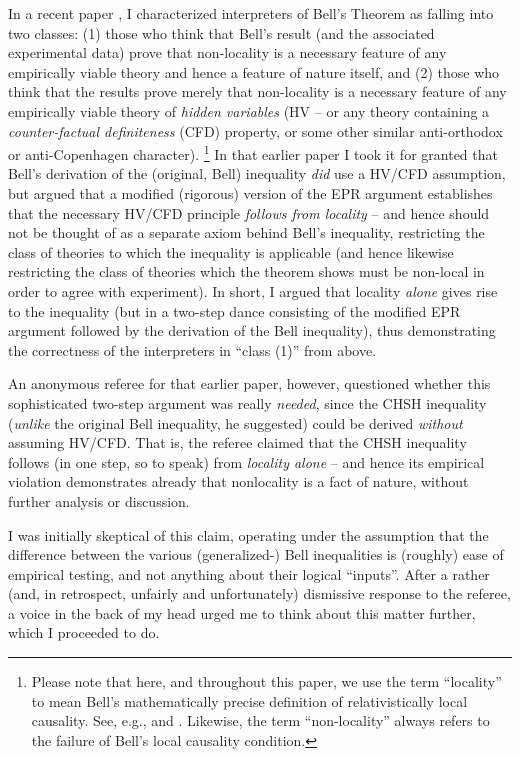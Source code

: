 \documentclass[aps,prc,twocolumn]{revtex4}
\begin{document}
In a recent paper \cite{nonlocchar}, 
I characterized interpreters of Bell's Theorem 
\cite{bell} as falling into two classes:  (1) those who think that
Bell's result (and the associated experimental data) prove that
non-locality is a necessary feature of any empirically viable theory
and hence a feature of nature itself, and (2) those who think that the
results prove merely that non-locality is a necessary feature of any
empirically viable theory of \emph{hidden variables} (HV -- or any theory
containing a \emph{counter-factual definiteness} (CFD) property, or some
other similar anti-orthodox or anti-Copenhagen character).  
\footnote{Please note that here, and throughout this paper, we use the
  term ``locality'' to mean Bell's
  mathematically precise definition of relativistically local
  causality.  See, e.g., \cite[pg 232-248, pg 52-62]{bell} and
  \cite{nonlocchar}.  Likewise, the term ``non-locality'' always
  refers to the failure of Bell's local causality condition.}
In that earlier paper I took it for granted that Bell's derivation of
the (original, Bell) inequality \emph{did} use a HV/CFD assumption,
but argued that a modified (rigorous) version of the EPR argument \cite{epr}
establishes that the necessary HV/CFD principle \emph{follows from
  locality} -- and hence should not be thought of as a separate axiom
behind Bell's inequality, restricting the class of theories to which
the inequality is applicable (and hence likewise restricting the class
of theories which the theorem shows must be non-local in order to agree with
experiment).  In short, I argued that locality \emph{alone} gives rise
to the inequality (but in a two-step dance consisting of the modified
EPR argument followed by the derivation of the Bell inequality), thus
demonstrating the correctness of the interpreters in ``class (1)''
from above.

An anonymous referee for that earlier paper, however, questioned
whether this sophisticated two-step argument was really \emph{needed},
since the CHSH \cite{chsh}
inequality (\emph{unlike} the original Bell inequality,
he suggested) could be derived \emph{without} assuming HV/CFD.  That
is, the referee claimed that the CHSH inequality follows (in one step,
so to speak) from \emph{locality alone} -- and hence its empirical
violation demonstrates already that nonlocality is a fact of nature,
without further analysis or discussion.  \cite{skyrms}

I was initially skeptical of this claim, operating under the
assumption that the difference between the various (generalized-) Bell
inequalities is (roughly) ease of empirical testing, and not anything
about their logical ``inputs''.  After a rather (and, in retrospect,
unfairly and unfortunately) dismissive response to the referee, a
voice in the back of my head urged me to think about this matter
further, which I proceeded to do.  
\end{document}
